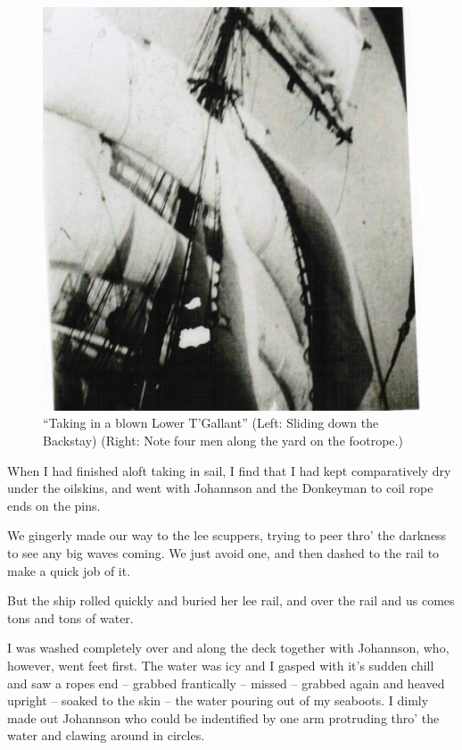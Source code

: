 \documentclass[
  11pt,
  msmallroyalvopaper
]{memoir}
\begin{document}
\begin{figure}
\centering
\includegraphics{./images/image010.png}
\caption{``Taking in a blown Lower T'Gallant'' (Left: Sliding down the
Backstay) (Right: Note four men along the yard on the footrope.)}
\end{figure}

When I had finished aloft taking in sail, I find that I had kept
comparatively dry under the oilskins, and went with Johannson and the
Donkeyman to coil rope ends on the pins.

We gingerly made our way to the lee scuppers, trying to peer thro' the
darkness to see any big waves coming. We just avoid one, and then dashed
to the rail to make a quick job of it.

But the ship rolled quickly and buried her lee rail, and over the rail
and us comes tons and tons of water.

I was washed completely over and along the deck together with Johannson,
who, however, went feet first. The water was icy and I gasped with it's
sudden chill and saw a ropes end -- grabbed frantically -- missed --
grabbed again and heaved upright -- soaked to the skin -- the water
pouring out of my seaboots. I dimly made out Johannson who could be
indentified by one arm protruding thro' the water and clawing around in
circles.
\end{document}
